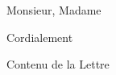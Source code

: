 \documentclass[11pt,a4paper,roman]{moderncv}
\begin{document}
\date{\today}
\opening{Monsieur, Madame} %
\closing{Cordialement} %
\makelettertitle  


Contenu de la Lettre

\vspace{0.5cm}
\makeletterclosing
\end{document}
